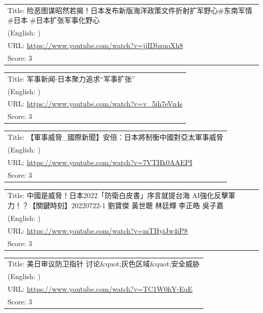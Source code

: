 \documentclass{article}
\begin{document}
\noindent
\begin{tabular}{p{}}
Title: 险恶图谋昭然若揭！日本发布新版海洋政策文件折射扩军野心\#东南军情  \#日本 \#日本扩张军事化野心 \\
(English: ) \\
URL: \url{https://www.youtube.com/watch?v=jjIDbxuoXh8} \\
Score: 3 \\
\end{tabular}
\vspace{0.5em}

\noindent
\begin{tabular}{p{}}
Title: 军事新闻-日本聚力追求“军事扩张” \\
(English: ) \\
URL: \url{https://www.youtube.com/watch?v=v_5ih7eVu4s} \\
Score: 3 \\
\end{tabular}
\vspace{0.5em}

\noindent
\begin{tabular}{p{}}
Title: 【軍事威脅\_國際新聞】安倍：日本將制衡中國對亞太軍事威脅 \\
(English: ) \\
URL: \url{https://www.youtube.com/watch?v=7VTHk0AAEPI} \\
Score: 3 \\
\end{tabular}
\vspace{0.5em}

\noindent
\begin{tabular}{p{}}
Title: 中國是威脅！日本2022「防衛白皮書」序言就提台海 AI強化反擊軍力！？【關鍵時刻】20220722-1 劉寶傑 黃世聰 林廷輝 李正皓 吳子嘉 \\
(English: ) \\
URL: \url{https://www.youtube.com/watch?v=mTHyiJw4iP8} \\
Score: 3 \\
\end{tabular}
\vspace{0.5em}

\noindent
\begin{tabular}{p{}}
Title: 美日审议防卫指针 讨论\&quot;灰色区域\&quot;安全威胁 \\
(English: ) \\
URL: \url{https://www.youtube.com/watch?v=TC1W0hY-EqE} \\
Score: 3 \\
\end{tabular}
\vspace{0.5em}
\end{document}
